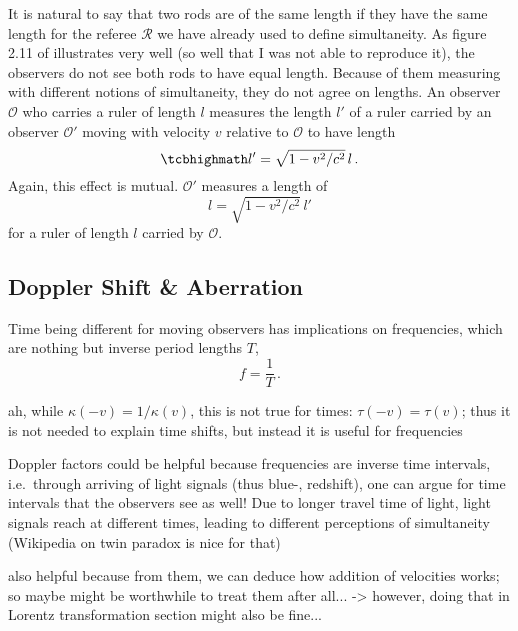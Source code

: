 It is natural to say that two rods are of the same length if they have the same length for the referee $\mathcal{R}$ we have already used to define simultaneity. As figure 2.11 of \cite{dragon_geometry_srt} illustrates very well (so well that I was not able to reproduce it), the observers do not see both rods to have equal length. Because of them measuring with different notions of simultaneity, they do not agree on lengths. An observer $\mathcal{O}$ who carries a ruler of length $l$ measures the length $l'$ of a ruler carried by an observer $\mathcal{O}'$ moving with velocity $v$ relative to $\mathcal{O}$ to have length
\begin{equation}\label{eq:length_contraction}
	\eqbox{
	l' = \sqrt{1 - v^2 / c^2} \, l
	} \, .
\end{equation}
Again, this effect is mutual. $\mathcal{O}'$ measures a length of
\begin{equation*}
	l = \sqrt{1 - v^2 / c^2} \, l'
\end{equation*}
for a ruler of length $l$ carried by $\mathcal{O}$.




		\subsection{Doppler Shift \& Aberration}
Time being different for moving observers has implications on frequencies, which are nothing but inverse period lengths $T$,
\begin{equation}
	f = \frac{1}{T} \, .
\end{equation}


ah, while $\kappa(-v) = 1 / \kappa(v)$, this is not true for times: $\tau(-v) = \tau(v)$; thus it is not needed to explain time shifts, but instead it is useful for frequencies


Doppler factors could be helpful because frequencies are inverse time intervals, i.e.~through arriving of light signals (thus blue-, redshift), one can argue for time intervals that the observers see as well! Due to longer travel time of light, light signals reach at different times, leading to different perceptions of simultaneity (Wikipedia on twin paradox is nice for that)


also helpful because from them, we can deduce how addition of velocities works; so maybe might be worthwhile to treat them after all... -> however, doing that in Lorentz transformation section might also be fine...



